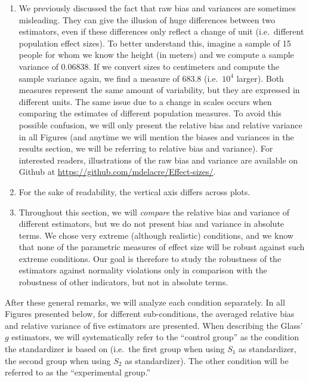 \documentclass[
  english,
  man,floatsintext]{apa6}
\begin{document}
\begin{enumerate}
\def\labelenumi{\arabic{enumi})}
\item
  We previously discussed the fact that raw bias and variances are sometimes misleading. They can give the illusion of huge differences between two estimators, even if these differences only reflect a change of unit (i.e.~different population effect sizes). To better understand this, imagine a sample of 15 people for whom we know the height (in meters) and we compute a sample variance of 0.06838. If we convert sizes to centimeters and compute the sample variance again, we find a measure of 683.8 (i.e.~\(10^4\) larger). Both measures represent the same amount of variability, but they are expressed in different units. The same issue due to a change in scales occurs when comparing the estimates of different population measures. To avoid this possible confusion, we will only present the relative bias and relative variance in all Figures (and anytime we will mention the biases and variances in the results section, we will be referring to relative bias and variance). For interested readers, illustrations of the raw bias and variance are available on Github at \url{https://github.com/mdelacre/Effect-sizes/}.
\item
  For the sake of readability, the vertical axis differs across plots.
\item
  Throughout this section, we will \emph{compare} the relative bias and variance of different estimators, but we do not present bias and variance in absolute terms. We chose very extreme (although realistic) conditions, and we know that none of the parametric measures of effect size will be robust against such extreme conditions. Our goal is therefore to study the robustness of the estimators against normality violations only in comparison with the robustness of other indicators, but not in absolute terms.
\end{enumerate}

After these general remarks, we will analyze each condition separately. In all Figures presented below, for different sub-conditions, the averaged relative bias and relative variance of five estimators are presented. When describing the Glass' \(g\) estimators, we will systematically refer to the ``control group'' as the condition the standardizer is based on (i.e.~the first group when using \(S_1\) as standardizer, the second group when using \(S_2\) as standardizer). The other condition will be referred to as the ``experimental group.''
\end{document}
